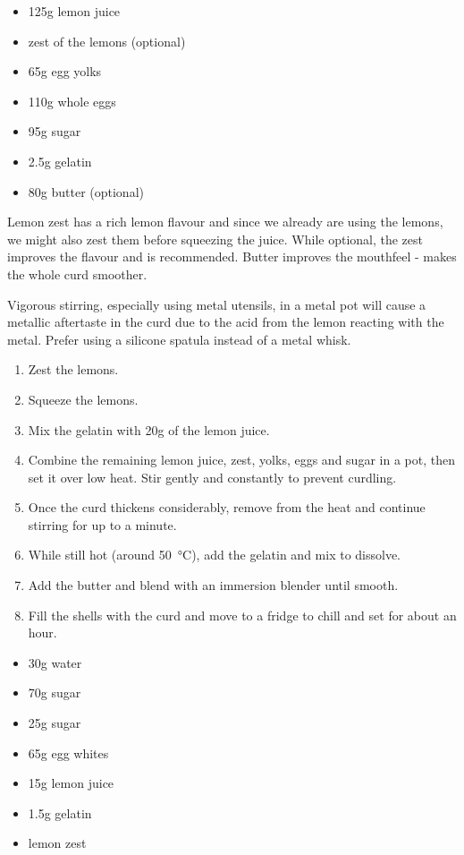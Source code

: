 \begin{itemize}
  \item 125g lemon juice
  \item zest of the lemons (optional)
  \item 65g egg yolks
  \item 110g whole eggs
  \item 95g sugar
  \item 2.5g gelatin
  \item 80g butter (optional)
\end{itemize}
Lemon zest has a rich lemon flavour and since we already are using the lemons,
we might also zest them before squeezing the juice. While optional, the zest
improves the flavour and is recommended. Butter improves the mouthfeel - makes
the whole curd smoother.

Vigorous stirring, especially using metal utensils, in a metal pot will cause a
metallic aftertaste in the curd due to the acid from the lemon reacting with
the metal. Prefer using a silicone spatula instead of a metal whisk.
\begin{enumerate}
  \item Zest the lemons.
  \item Squeeze the lemons.
  \item Mix the gelatin with 20g of the lemon juice.
  \item Combine the remaining lemon juice, zest, yolks, eggs and sugar in a pot,
    then set it over low heat. Stir gently and constantly to prevent curdling.
  \item Once the curd thickens considerably, remove from the heat and continue
    stirring for up to a minute.
  \item While still hot (around \SI{50}{\celsius}), add the gelatin and mix to
    dissolve.
  \item Add the butter and blend with an immersion blender until smooth.
  \item Fill the shells with the curd and move to a fridge to chill and set for
    about an hour.
\end{enumerate}

\begin{itemize}
  \item 30g water 
  \item 70g sugar 
  \item 25g sugar 
  \item 65g egg whites 
  \item 15g lemon juice
  \item 1.5g gelatin
  \item lemon zest
\end{itemize}

